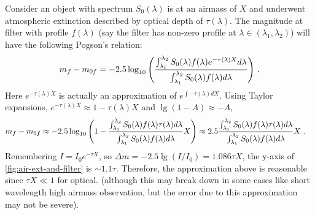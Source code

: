 Consider an object with spectrum $ S_0(\lambda) $ is at an airmass of $ X $ and underwent atmospheric extinction described by optical depth of $ \tau(\lambda) $. The magnitude at filter with profile $ f(\lambda) $ (say the filter has non-zero profile at $ \lambda \in (\lambda_1, \lambda_2) $) will have the following Pogson's relation:
\begin{equation}
  m_f - m_{0f}
    = -2.5 \log_{10}
      \qty( \frac{\int_{\lambda_1}^{\lambda_2} S_0(\lambda) f(\lambda) e^{-\tau(\lambda) X} d\lambda}
      {\int_{\lambda_1}^{\lambda_2} S_0(\lambda) f(\lambda) d\lambda} ) ~.
\end{equation}
Here $ e^{-\tau(\lambda) X} $ is actually an approximation of $ e^{\int -\tau(\lambda) dX} $. Using Taylor expansions, $ e^{-\tau(\lambda) X} \approx 1 - \tau(\lambda) X $ and $ \lg (1 - A) \approx - A $, 
\begin{equation}
\begin{aligned}
    m_f - m_{0f} 
    &\approx -2.5 \log_{10} 
      \qty( 1 - \frac{\int_{\lambda_1}^{\lambda_2} S_0(\lambda) f(\lambda) \tau(\lambda) d\lambda}
        {\int_{\lambda_1}^{\lambda_2} S_0(\lambda) f(\lambda) d\lambda} X ) 
    \approx 2.5 \frac{\int_{\lambda_1}^{\lambda_2} S_0(\lambda) f(\lambda) \tau(\lambda) d\lambda}
            {\int_{\lambda_1}^{\lambda_2} S_0(\lambda) f(\lambda) d\lambda} X ~.
\end{aligned}  
\end{equation}
Remembering $ I = I_0 e^{-\tau X} $, so $ \Delta m = -2.5 \lg (I / I_0) = 1.086 \tau X $, the y-axis of \cref{fig:air-ext-and-filter} is $ \sim 1.1 \tau $. Therefore, the approximation above is reasonable since $ \tau X \ll 1 $ for optical. (although this may break down in some cases like short wavelength high airmass observation, but the error due to this approximation may not be severe). 

